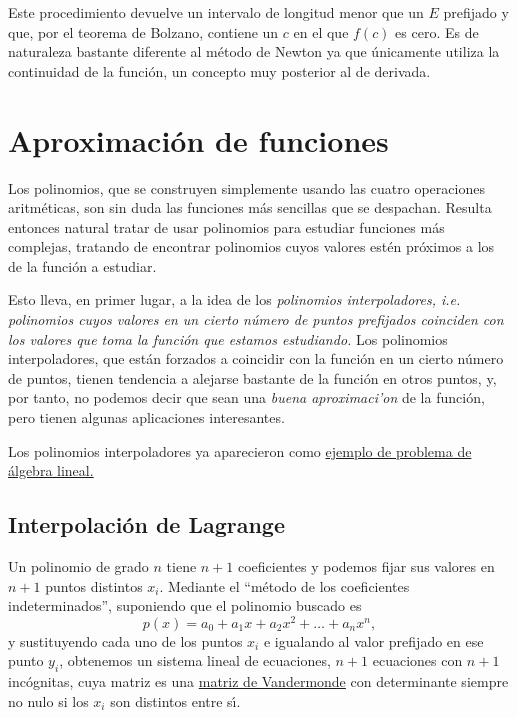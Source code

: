 Este procedimiento devuelve un intervalo de longitud menor que un $E$ prefijado
y que, por el teorema de Bolzano, contiene un $c$ en el que $f(c)$ es cero. Es
de naturaleza bastante diferente al m\'etodo de Newton ya que \'unicamente
utiliza la continuidad de la funci\'on, un concepto muy posterior al de
derivada.



\section{Aproximaci\'on de funciones}
Los polinomios, que se construyen simplemente usando las cuatro operaciones
aritm\'eticas, son sin duda las funciones m\'as sencillas que se despachan. 
Resulta entonces natural tratar de usar polinomios para estudiar funciones m\'as
complejas, tratando de encontrar polinomios cuyos valores est\'en pr\'oximos a
los de la funci\'on a estudiar. 

Esto lleva, en primer lugar, a la idea de los {\itshape polinomios
interpoladores, i.e. polinomios cuyos valores en 
un  cierto n\'umero de puntos prefijados coinciden con los valores que toma la
funci\'on que estamos estudiando.}  Los polinomios interpoladores, que est\'an
forzados a coincidir con la funci\'on  en un cierto n\'umero de puntos,
tienen tendencia a alejarse bastante de la funci\'on en otros puntos, y, por
tanto, no podemos decir que sean una {\itshape buena aproximaci'on} de la
funci\'on, pero tienen algunas aplicaciones interesantes. 

Los polinomios interpoladores  ya aparecieron  como \hyperref[interp1]{ejemplo
de problema de \'algebra lineal.}

\subsection{Interpolaci\'on de Lagrange}\label{pol-int}

Un polinomio de grado $n$ tiene $n+1$ coeficientes y podemos fijar sus valores
en $n+1$ puntos distintos $x_i$. Mediante el ``m\'etodo de los coeficientes
indeterminados'', suponiendo que el polinomio buscado es
\[p(x)=a_0+a_1x+a_2x^2+\dots+a_nx^n,\]
\noindent y sustituyendo cada uno de los puntos $x_i$ e igualando al valor
prefijado en ese punto $y_i$, obtenemos un sistema lineal %
de ecuaciones, $n+1$ ecuaciones con $n+1$ inc\'ognitas, cuya matriz es una 
\href{http://en.wikipedia.org/wiki/Vandermonde_matrix}{matriz de Vandermonde}
con determinante siempre no nulo si los $x_i$ son distintos entre s\'{\i}.

